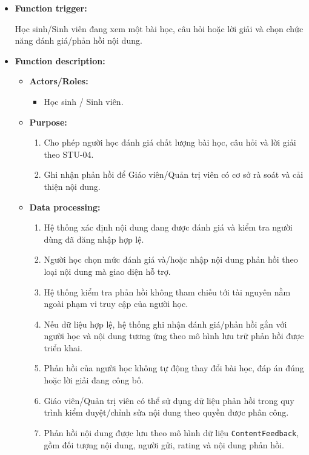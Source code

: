 \documentclass[12pt,a4paper,oneside]{report}
\begin{document}
\begin{itemize}

    \item \textbf{Function trigger:}

    Học sinh/Sinh viên đang xem một bài học, câu hỏi hoặc lời giải và chọn chức năng đánh giá/phản hồi nội dung.

    \item \textbf{Function description:}

    \begin{itemize}

        \item \textbf{Actors/Roles:}
        \begin{itemize}
            \item Học sinh / Sinh viên.
        \end{itemize}

        \item \textbf{Purpose:}
        \begin{enumerate}
            \item Cho phép người học đánh giá chất lượng bài học, câu hỏi và lời giải theo STU-04.
            \item Ghi nhận phản hồi để Giáo viên/Quản trị viên có cơ sở rà soát và cải thiện nội dung.
        \end{enumerate}

        \item \textbf{Data processing:}
        \begin{enumerate}
            \item Hệ thống xác định nội dung đang được đánh giá và kiểm tra người dùng đã đăng nhập hợp lệ.
            \item Người học chọn mức đánh giá và/hoặc nhập nội dung phản hồi theo loại nội dung mà giao diện hỗ trợ.
            \item Hệ thống kiểm tra phản hồi không tham chiếu tới tài nguyên nằm ngoài phạm vi truy cập của người học.
            \item Nếu dữ liệu hợp lệ, hệ thống ghi nhận đánh giá/phản hồi gắn với người học và nội dung tương ứng theo mô hình lưu trữ phản hồi được triển khai.
            \item Phản hồi của người học không tự động thay đổi bài học, đáp án đúng hoặc lời giải đang công bố.
            \item Giáo viên/Quản trị viên có thể sử dụng dữ liệu phản hồi trong quy trình kiểm duyệt/chỉnh sửa nội dung theo quyền được phân công.
            \item Phản hồi nội dung được lưu theo mô hình dữ liệu \texttt{ContentFeedback}, gồm đối tượng nội dung, người gửi, rating và nội dung phản hồi.
        \end{enumerate}


\end{itemize}
\end{itemize}
\end{document}
